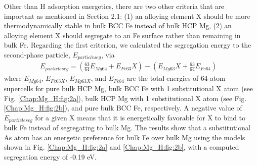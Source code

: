 Other than H adsorption energetics, there are two other criteria that are important as mentioned in Section 2.1: (1) an alloying element X should be more thermodynamically stable in bulk \ac{BCC} Fe instead of bulk \ac{HCP} Mg, (2) an alloying element X should segregate to an Fe surface rather than remaining in bulk Fe. Regarding the first criterion, we calculated the segregation energy to the second-phase particle, $E_{particle seg}$, via
\begin{align}
 E_{particle seg} = (\frac{63}{64}E_{Mg64} + E_{Fe63}X) - (E_{Mg63}X + \frac{63}{64}E_{Fe64})
 \label{Chap:Mg_H:eq:particle_seg}
\end{align}
where $E_{Mg64}$, $E_{Fe63X}$, $E_{Mg63X}$, and $E_{Fe64}$ are the total energies of 64-atom supercells for pure bulk HCP Mg, bulk \ac{BCC} Fe with 1 substitutional X atom (see Fig. \ref{Chap:Mg_H:fig:2a}), bulk HCP Mg with 1 substitutional X atom (see Fig. \ref{Chap:Mg_H:fig:2b}), and pure bulk \ac{BCC} Fe, respectively. A negative value of $E_{particle seg}$ for a given X means that it is energetically favorable for X to bind to bulk Fe instead of segregating to bulk Mg. The results show that a substitutional As atom has an energetic preference for bulk Fe over bulk Mg using the models shown in Fig. \ref{Chap:Mg_H:fig:2a} and \ref{Chap:Mg_H:fig:2b}, with a computed segregation energy of -0.19 eV.

